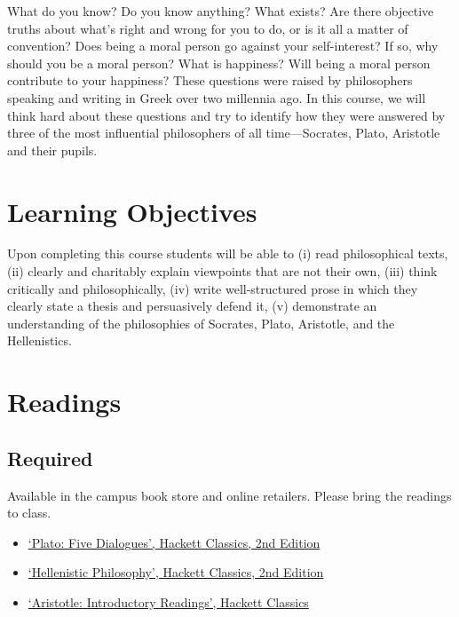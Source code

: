 \documentclass[article,oneside]{memoir}
\begin{document}
What do you know? Do you know anything? What exists? Are there objective truths about what’s right and wrong for you to do, or is it all a matter of convention? Does being a moral person go against your self-interest? If so, why should you be a moral person? What is happiness? Will being a moral person contribute to your happiness? These questions were raised by philosophers speaking and writing in Greek over two millennia ago. In this course, we will think hard about these questions and try to identify how they were answered by three of the most influential philosophers of all time---Socrates, Plato, Aristotle and their pupils. 

\section{Learning Objectives}

Upon completing this course students will be able to (i) read
philosophical texts, (ii) clearly and charitably explain viewpoints that
are not their own, (iii) think critically and philosophically, (iv)
write well-structured prose in which they clearly state a thesis and
persuasively defend it, (v) demonstrate an understanding of the
philosophies of Socrates, Plato, Aristotle, and the Hellenistics.


\section{Readings}
\subsection{Required}
Available in the campus book store and online retailers. Please bring the readings to class.
\begin{itemize}
\item \href{http://www.amazon.com/Plato-Dialogues-Euthyphro-Apology-Classics/dp/0872206335/ref=sr_1_1?ie=UTF8&qid=1452099006&sr=8-1&keywords=plato+five+dialogues}{`Plato: Five Dialogues', Hackett Classics, 2nd Edition}
\item \href{http://www.amazon.com/Hellenistic-Philosophy-Hackett-Classics-Inwood/dp/0872203786/ref=sr_1_1?ie=UTF8&qid=1452099186&sr=8-1&keywords=hellenistic+philosophy}{`Hellenistic Philosophy', Hackett Classics, 2nd Edition}
\item \href{http://www.amazon.com/Aristotle-Introductory-Readings-Hackett-Classics/dp/0872203395/ref=sr_1_1?ie=UTF8&qid=1452102830&sr=8-1&keywords=aristotle+hackett}{`Aristotle: Introductory Readings', Hackett Classics}
\end{itemize}
\end{document}
